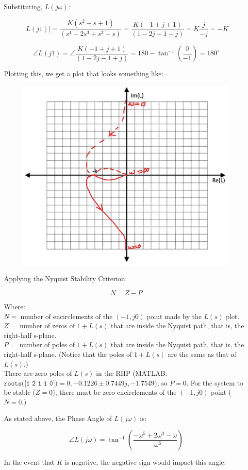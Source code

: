 \documentclass[12pt, letterpaper]{../assignment}
\begin{document}
Substituting, $L(j\omega)$:

$$ |L(j1)| = \frac{K(s^2 + s + 1)}{(s^4 + 2s^3 + s^2 + s)} = \frac{K(-1 + j + 1)}{(1 - 2j -1 + j)} = K\frac{j}{-j} = -K $$

$$ \angle L(j1) = \angle \frac{K(-1 + j + 1)}{(1 - 2j -1 + j)} = 180 -\tan^{-1}\left(\frac{0}{-1}\right) = 180^\circ  $$

Plotting this, we get a plot that looks something like:

\begin{figure}[H]
    \centering
    \includegraphics[width=0.5\linewidth]{./figures/PolarPlot1.png}
    \label{fig:pp1}
 \end{figure}

Applying the Nyquist Stability Criterion:

 $$ N=Z-P $$
 
Where:\\
$N =$ number of encirclements of the $(-1, j0)$ point made by the $L(s)$ plot.\\
$Z =$ number of zeros of $1+L(s)$ that are inside the Nyquist path, that is, the right-half s-plane.\\
$P =$ number of poles of $1+L(s)$ that are inside the Nyquist path, that is, the right-half s-plane.
(Notice that the poles of $1 +L(s)$ are the same as that of $L(s)$.)\\

There are zero poles of $L(s)$ in the RHP (MATLAB: $\texttt{roots([1 2 1 1 0])} = 0,- 0.1226 \pm 0.7449j,-1.7549$), so $P = 0$.
For the system to be stable ($Z=0$),
there must be zero encirclements of the $(-1, j0)$ point ($N = 0$.)

As stated above, the Phase Angle of $L(j\omega)$ is:

$$ \angle L(j\omega) = \tan^{-1}\left( \frac{-\omega ^5 +2 \omega ^3 -\omega  }{-\omega ^6}\right) $$

In the event that $K$ is negative, the negative sign would impact this angle:
\end{document}
